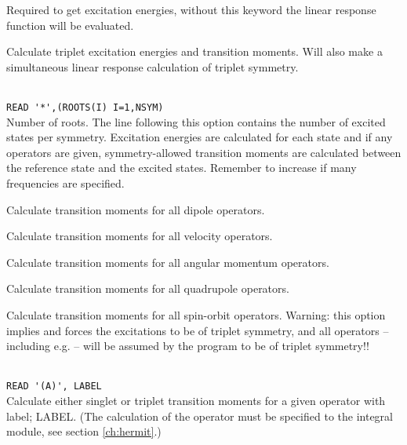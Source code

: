 \begin{description}

\item{} Required to get excitation energies, without
this keyword the linear response function will be evaluated.

\item{} Calculate triplet excitation energies and transition moments.
Will also make a simultaneous linear response calculation of triplet symmetry.

\item{}\\
\verb|READ '*',(ROOTS(I) I=1,NSYM)|\\
Number of roots.  The line following this option contains the number
of excited states per symmetry. Excitation
energies are calculated for each state and if
any operators are given, 
symmetry-allowed transition moments are
calculated between the 
reference state and the excited states.
Remember to increase  if many frequencies are specified.

\item{}
Calculate transition moments for all dipole operators.

\item{}
Calculate transition moments for all velocity operators.

\item{}
Calculate transition moments for all angular momentum operators.

\item{}
Calculate transition moments for all quadrupole operators.

\item{}
Calculate transition moments for all spin-orbit operators.
Warning: this option implies  and
forces the excitations to be of triplet symmetry,
and all operators -- including
e.g.  -- will be assumed by the program to be of triplet symmetry!!

\item{}\\
\verb|READ '(A)', LABEL|\\
Calculate either singlet or triplet transition moments for a given operator with label; LABEL.
(The calculation of the operator must be specified to the integral
module, see section \ref{ch:hermit}.)


\end{description}
